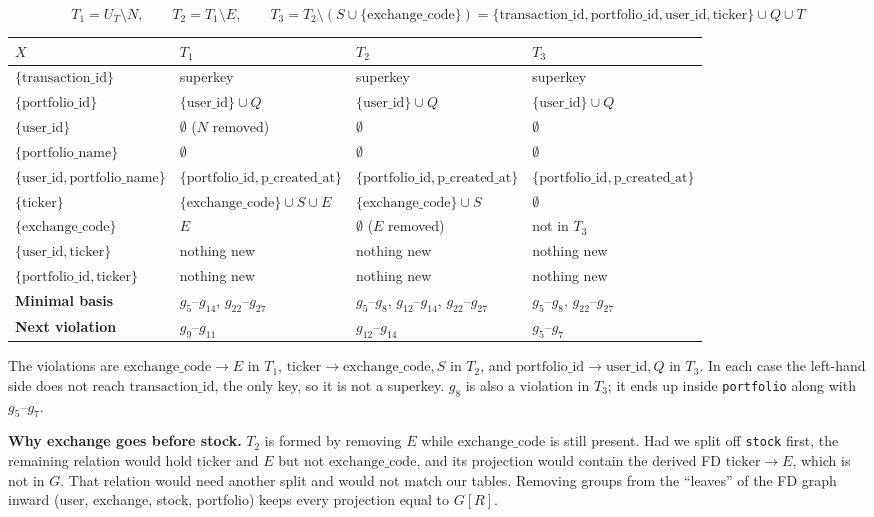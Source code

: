\documentclass{article}
\newcommand{\at}[1]{\text{#1}}
\newcommand{\gr}[2]{g_{#1}\text{--}g_{#2}}
\begin{document}
\[
  T_1 = U_T \setminus N, \qquad T_2 = T_1 \setminus E, \qquad T_3 = T_2 \setminus (S \cup \{\at{exchange\_code}\}) = \{\at{transaction\_id}, \at{portfolio\_id}, \at{user\_id}, \at{ticker}\} \cup Q \cup T
\]
\begin{center}
\small
\begin{tabular}{l l l l}
  \toprule
  $X$ & $T_1$ & $T_2$ & $T_3$ \\
  \midrule
  $\{\at{transaction\_id}\}$ & superkey & superkey & superkey \\
  $\{\at{portfolio\_id}\}$ & $\{\at{user\_id}\} \cup Q$ & $\{\at{user\_id}\} \cup Q$ & $\{\at{user\_id}\} \cup Q$ \\
  $\{\at{user\_id}\}$ & $\emptyset$ ($N$ removed) & $\emptyset$ & $\emptyset$ \\
  $\{\at{portfolio\_name}\}$ & $\emptyset$ & $\emptyset$ & $\emptyset$ \\
  $\{\at{user\_id}, \at{portfolio\_name}\}$ & $\{\at{portfolio\_id}, \at{p\_created\_at}\}$ & $\{\at{portfolio\_id}, \at{p\_created\_at}\}$ & $\{\at{portfolio\_id}, \at{p\_created\_at}\}$ \\
  $\{\at{ticker}\}$ & $\{\at{exchange\_code}\} \cup S \cup E$ & $\{\at{exchange\_code}\} \cup S$ & $\emptyset$ \\
  $\{\at{exchange\_code}\}$ & $E$ & $\emptyset$ ($E$ removed) & not in $T_3$ \\
  $\{\at{user\_id}, \at{ticker}\}$ & nothing new & nothing new & nothing new \\
  $\{\at{portfolio\_id}, \at{ticker}\}$ & nothing new & nothing new & nothing new \\
  \midrule
  \textbf{Minimal basis} & $\gr{5}{14}$, $\gr{22}{27}$ & $\gr{5}{8}$, $\gr{12}{14}$, $\gr{22}{27}$ & $\gr{5}{8}$, $\gr{22}{27}$ \\
  \textbf{Next violation} & $\gr{9}{11}$ & $\gr{12}{14}$ & $\gr{5}{7}$ \\
  \bottomrule
\end{tabular}
\end{center}
The violations are $\at{exchange\_code} \rightarrow E$ in $T_1$, $\at{ticker} \rightarrow \at{exchange\_code}, S$ in $T_2$, and $\at{portfolio\_id} \rightarrow \at{user\_id}, Q$ in $T_3$. In each case the left-hand side does not reach $\at{transaction\_id}$, the only key, so it is not a superkey. $g_8$ is also a violation in $T_3$; it ends up inside \texttt{portfolio} along with $\gr{5}{7}$.

\textbf{Why exchange goes before stock.} $T_2$ is formed by removing $E$ while $\at{exchange\_code}$ is still present. Had we split off \texttt{stock} first, the remaining relation would hold $\at{ticker}$ and $E$ but not $\at{exchange\_code}$, and its projection would contain the derived FD $\at{ticker} \rightarrow E$, which is not in $G$. That relation would need another split and would not match our tables. Removing groups from the ``leaves'' of the FD graph inward (user, exchange, stock, portfolio) keeps every projection equal to $G[R]$.
\end{document}
